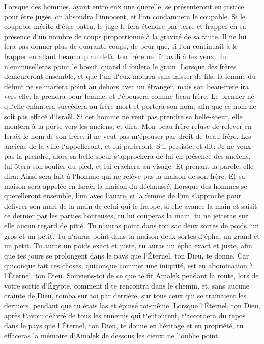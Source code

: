 \verse Lorsque des hommes, ayant entre eux une querelle, se présenteront en justice pour être jugés, on absoudra l`innocent, et l`on condamnera le coupable. 
\verse Si le coupable mérite d`être battu, le juge le fera étendre par terre et frapper en sa présence d`un nombre de coups proportionné à la gravité de sa faute. 
\verse Il ne lui fera pas donner plus de quarante coups, de peur que, si l`on continuait à le frapper en allant beaucoup au delà, ton frère ne fût avili à tes yeux. 
\verse Tu n`emmuselleras point le boeuf, quand il foulera le grain. 
\verse Lorsque des frères demeureront ensemble, et que l`un d`eux mourra sans laisser de fils, la femme du défunt ne se mariera point au dehors avec un étranger, mais son beau-frère ira vers elle, la prendra pour femme, et l`épousera comme beau-frère. 
\verse Le premier-né qu`elle enfantera succédera au frère mort et portera son nom, afin que ce nom ne soit pas effacé d`Israël. 
\verse Si cet homme ne veut pas prendre sa belle-soeur, elle montera à la porte vers les anciens, et dira: Mon beau-frère refuse de relever en Israël le nom de son frère, il ne veut pas m`épouser par droit de beau-frère. 
\verse Les anciens de la ville l`appelleront, et lui parleront. S`il persiste, et dit: Je ne veux pas la prendre, 
\verse alors sa belle-soeur s`approchera de lui en présence des anciens, lui ôtera son soulier du pied, et lui crachera au visage. Et prenant la parole, elle dira: Ainsi sera fait à l`homme qui ne relève pas la maison de son frère. 
\verse Et sa maison sera appelée en Israël la maison du déchaussé. 
\verse Lorsque des hommes se querelleront ensemble, l`un avec l`autre, si la femme de l`un s`approche pour délivrer son mari de la main de celui qui le frappe, si elle avance la main et saisit ce dernier par les parties honteuses, 
\verse tu lui couperas la main, tu ne jetteras sur elle aucun regard de pitié. 
\verse Tu n`auras point dans ton sac deux sortes de poids, un gros et un petit. 
\verse Tu n`auras point dans ta maison deux sortes d`épha, un grand et un petit. 
\verse Tu auras un poids exact et juste, tu auras un épha exact et juste, afin que tes jours se prolongent dans le pays que l`Éternel, ton Dieu, te donne. 
\verse Car quiconque fait ces choses, quiconque commet une iniquité, est en abomination à l`Éternel, ton Dieu. 
\verse Souviens-toi de ce que te fit Amalek pendant la route, lors de votre sortie d`Égypte, 
\verse comment il te rencontra dans le chemin, et, sans aucune crainte de Dieu, tomba sur toi par derrière, sur tous ceux qui se traînaient les derniers, pendant que tu étais las et épuisé toi-même. 
\verse Lorsque l`Éternel, ton Dieu, après t`avoir délivré de tous les ennemis qui t`entourent, t`accordera du repos dans le pays que l`Éternel, ton Dieu, te donne en héritage et en propriété, tu effaceras la mémoire d`Amalek de dessous les cieux: ne l`oublie point. 

